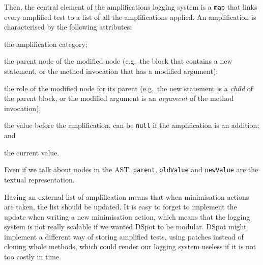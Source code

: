 \documentclass[a4paper,11pt]{sdm_internship}
\newcommand{\todo}[1]{\colorbox{Red!75}{\textcolor{white}{\textbf{TODO\ifx&#1&\else: #1\fi}}}}
\newcommand{\dspot}{DSpot\xspace}
\theoremstyle{definition}
\begin{document}
Then, the central element of the amplifications logging system is a \texttt{map} that links every amplified test to a list of all the amplifications applied.
An amplification is characterised by the following attributes:
\begin{description}[itemindent=0em,labelwidth=7em,leftmargin=7em,align=right]
  \item[\texttt{ampCategory}] the amplification category;
  \item[\texttt{parent}] the parent node of the modified node (e.g.\ the block that contains a new statement, or the method invocation that has a modified argument);
  \item[\texttt{role}] the role of the modified node for its parent (e.g.\ the new statement is a \textit{child} of the parent block, or the modified argument is an \textit{argument} of the method invocation);
  \item[\texttt{oldValue}] the value before the amplification, can be \texttt{null} if the amplification is an addition; and
  \item[\texttt{newValue}] the current value.
\end{description}
Even if we talk about nodes in the AST, \texttt{parent}, \texttt{oldValue} and \texttt{newValue} are the textual representation.

Having an external list of amplification means that when minimisation actions are taken, the list should be updated.
It is easy to forget to implement the update when writing a new minimisation action, which means that the logging system is not really scalable if we wanted \dspot{} to be modular.
\dspot{} might implement a different way of storing amplified tests, using patches instead of cloning whole methods, which could render our logging system useless if it is not too costly in time.



\end{document}
